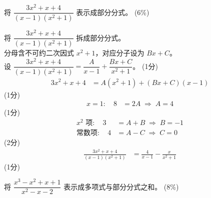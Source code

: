 \documentclass{exam-zh}
\begin{document}
\begin{question}[points = 6]
    将 $\dfrac{3x^2+x+4}{(x-1)(x^2+1)}$ 表示成部分分式。
    \hfill (6\%)
\end{question}

\begin{solution}
    将 $\dfrac{3x^2+x+4}{(x-1)(x^2+1)}$ 拆成部分分式。 \\
    分母含不可约二次因式 $x^2+1$，对应分子设为 $Bx+C$。 \\
    设 $\dfrac{3x^2+x+4}{(x-1)(x^2+1)}=\dfrac{A}{x-1}+\dfrac{Bx+C}{x^2+1}$。
    \hfill (1分)
    \begin{align*}
        3x^2+x+4 &= A(x^2+1)+(Bx+C)(x-1)
    \end{align*}
    \hfill (1分) \\
    \begin{align*}
        x=1:\quad 8 &= 2A \;\Rightarrow\; A=4
    \end{align*}
    \hfill (1分) \\
    \begin{align*}
        x^2\text{ 项}:\quad 3 &= A+B \;\Rightarrow\; B=-1 \\
        \text{常数项}:\quad 4 &= A-C \;\Rightarrow\; C=0
    \end{align*}
    \hfill (2分) \\
    \begin{align*}
        \frac{3x^2+x+4}{(x-1)(x^2+1)} &= \frac{4}{x-1}-\frac{x}{x^2+1}
    \end{align*}
    \hfill (1分)
\end{solution}

\begin{question}[points = 8]
    将 $\dfrac{x^3-x^2+x+1}{x^2-x-2}$ 表示成多项式与部分分式之和。
    \hfill (8\%)
\end{question}
\end{document}
